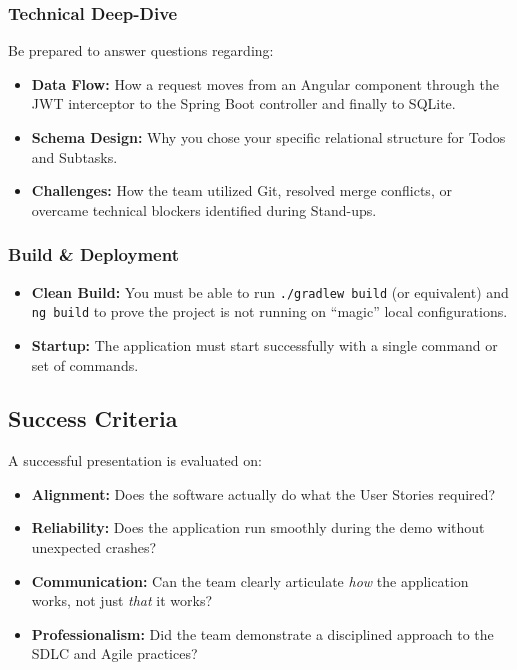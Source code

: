 \subsubsection{Technical Deep-Dive}
Be prepared to answer questions regarding:
\begin{itemize}
  \item \textbf{Data Flow:} How a request moves from an Angular component through the JWT interceptor to the Spring Boot controller and finally to SQLite.
  \item \textbf{Schema Design:} Why you chose your specific relational structure for Todos and Subtasks.
  \item \textbf{Challenges:} How the team utilized Git, resolved merge conflicts, or overcame technical blockers identified during Stand-ups.
\end{itemize}

\subsubsection{Build \& Deployment}
\begin{itemize}
  \item \textbf{Clean Build:} You must be able to run \texttt{./gradlew build} (or equivalent) and \texttt{ng build} to prove the project is not running on ``magic'' local configurations.
  \item \textbf{Startup:} The application must start successfully with a single command or set of commands.
\end{itemize}

\subsection{Success Criteria}
A successful presentation is evaluated on:
\begin{itemize}
  \item \textbf{Alignment:} Does the software actually do what the User Stories required?
  \item \textbf{Reliability:} Does the application run smoothly during the demo without unexpected crashes?
  \item \textbf{Communication:} Can the team clearly articulate \emph{how} the application works, not just \emph{that} it works?
  \item \textbf{Professionalism:} Did the team demonstrate a disciplined approach to the SDLC and Agile practices?
\end{itemize}

